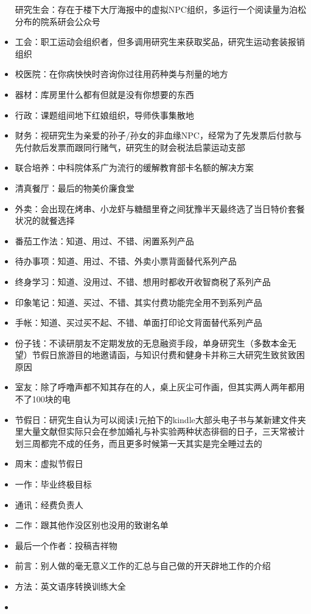 \documentclass[]{tufte-book}
\begin{document}
\begin{itemize}
  研究生会：存在于楼下大厅海报中的虚拟NPC组织，多运行一个阅读量为泊松分布的院系研会公众号
\item
  工会：职工运动会组织者，但多调用研究生来获取奖品，研究生运动套装报销组织
\item
  校医院：在你病怏怏时咨询你过往用药种类与剂量的地方
\item
  器材：库房里什么都有但就是没有你想要的东西
\item
  行政：课题组间地下红娘组织，导师佚事集散地
\item
  财务：视研究生为亲爱的孙子/孙女的非血缘NPC，经常为了先发票后付款与先付款后发票而跟同行赌气，研究生的财会税法启蒙运动支部
\item
  联合培养：中科院体系广为流行的缓解教育部卡名额的解决方案
\item
  清真餐厅：最后的物美价廉食堂
\item
  外卖：会出现在烤串、小龙虾与糖醋里脊之间犹豫半天最终选了当日特价套餐状况的就餐选择
\item
  番茄工作法：知道、用过、不错、闲置系列产品
\item
  待办事项：知道、用过、不错、外卖小票背面替代系列产品
\item
  终身学习：知道、没用过、不错、想用时都收开收智商税了系列产品
\item
  印象笔记：知道、买过、不错、其实付费功能完全用不到系列产品
\item
  手帐：知道、买过买不起、不错、单面打印论文背面替代系列产品
\item
  份子钱：不读研朋友不定期发放的无息融资手段，单身研究生（多数本金无望）节假日旅游目的地邀请函，与知识付费和健身卡并称三大研究生致贫致困原因
\item
  室友：除了呼噜声都不知其存在的人，桌上灰尘可作画，但其实两人两年都用不了100块的电
\item
  节假日：研究生自认为可以阅读1元拍下的kindle大部头电子书与某新建文件夹里大量文献但实际只会在参加婚礼与补实验两种状态徘徊的日子，三天常被计划三周都完不成的任务，而且更多时候第一天其实是完全睡过去的
\item
  周末：虚拟节假日
\item
  一作：毕业终极目标
\item
  通讯：经费负责人
\item
  二作：跟其他作没区别也没用的致谢名单
\item
  最后一个作者：投稿吉祥物
\item
  前言：别人做的毫无意义工作的汇总与自己做的开天辟地工作的介绍
\item
  方法：英文语序转换训练大全
\item

\end{itemize}
\end{document}
